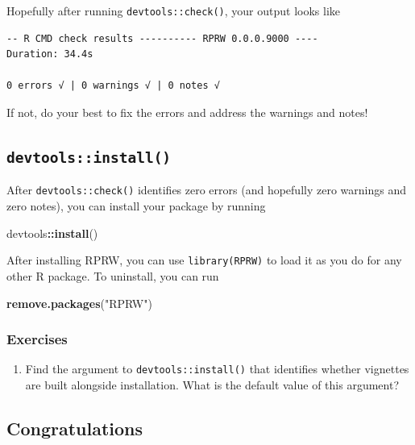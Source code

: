 \documentclass[
]{book}
\newenvironment{Shaded}{\begin{snugshade}}{\end{snugshade}}
\newcommand{\KeywordTok}[1]{\textcolor[rgb]{0.13,0.29,0.53}{\textbf{#1}}}
\newcommand{\NormalTok}[1]{#1}
\newcommand{\OperatorTok}[1]{\textcolor[rgb]{0.81,0.36,0.00}{\textbf{#1}}}
\newcommand{\StringTok}[1]{\textcolor[rgb]{0.31,0.60,0.02}{#1}}
\providecommand{\tightlist}{%
  \setlength{\itemsep}{0pt}\setlength{\parskip}{0pt}}
\begin{document}
Hopefully after running \texttt{devtools::check()}, your output looks like

\begin{verbatim}
-- R CMD check results ---------- RPRW 0.0.0.9000 ----
Duration: 34.4s

0 errors √ | 0 warnings √ | 0 notes √
\end{verbatim}

If not, do your best to fix the errors and address the warnings and notes!

\hypertarget{install}{%
\subsection{\texorpdfstring{\texttt{devtools::install()}}{devtools::install()}}\label{install}}

After \texttt{devtools::check()} identifies zero errors (and hopefully zero warnings and zero notes), you can install your package by running

\begin{Shaded}
\begin{Highlighting}[]
\NormalTok{devtools}\OperatorTok{::}\KeywordTok{install}\NormalTok{()}
\end{Highlighting}
\end{Shaded}

After installing RPRW, you can use \texttt{library(RPRW)} to load it as you do for any other R package. To uninstall, you can run

\begin{Shaded}
\begin{Highlighting}[]
\KeywordTok{remove.packages}\NormalTok{(}\StringTok{"RPRW"}\NormalTok{)}
\end{Highlighting}
\end{Shaded}

\hypertarget{ex-set5}{%
\subsubsection{Exercises}\label{ex-set5}}

\begin{enumerate}
\def\labelenumi{\arabic{enumi}.}
\tightlist
\item
  Find the argument to \texttt{devtools::install()} that identifies whether vignettes are built alongside installation. What is the default value of this argument?
\end{enumerate}

\hypertarget{congratulations}{%
\subsection{Congratulations}\label{congratulations}}
\end{document}
